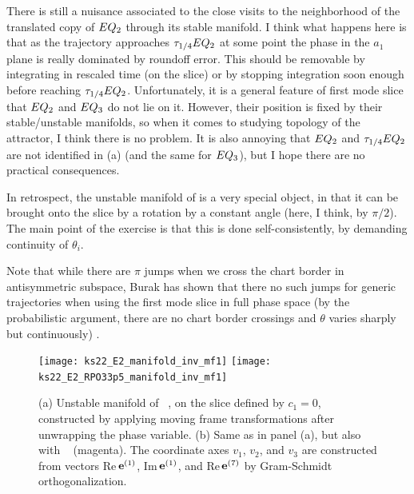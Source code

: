 \begin{description}
There is still a nuisance associated to the close visits to the neighborhood of
the translated copy of $\EQV{2}$ through its stable manifold. I think what happens
here is that as the trajectory approaches $\tau_{1/4}\EQV{2}$ at some point the phase in the
$a_1$ plane is really dominated by roundoff error. This should be removable by
integrating in rescaled time (on the slice) or by stopping integration soon enough
before reaching $\tau_{1/4}\EQV{2}$. Unfortunately, it is a general feature of first
mode slice that $\EQV{2}$ and $\EQV{3}$ do not lie on it. However, their
position is fixed by their stable/unstable manifolds, so when it comes to studying
topology of the attractor, I think there is no problem. It is also annoying that
$\EQV{2}$ and $\tau_{1/4}\EQV{2}$ are not identified in (a)
(and the same for $\EQV{3}$), but I hope there are no practical consequences.

In retrospect, the unstable manifold of  is a very special object, in that it
can be brought onto the slice by a rotation by a constant angle (here, I think,
by $\pi/2$). The main point of the exercise is that this is done self-consistently,
by demanding continuity of $\theta_i$.

Note that while there are $\pi$ jumps when we cross the chart border in antisymmetric
subspace, Burak has shown that there no such jumps for
generic trajectories when using the first mode slice in full phase space (by
the probabilistic argument, there are no chart border crossings and $\theta$
varies sharply but continuously)
.

\begin{figure}[ht]
\begin{center}
\texttt{[image: ks22\_E2\_manifold\_inv\_mf1]}
\texttt{[image: ks22\_E2\_RPO33p5\_manifold\_inv\_mf1]}
\end{center}
\caption{
(a) Unstable manifold of \eqv\ , on the slice defined by $c_1=0$,
constructed by applying moving frame transformations after unwrapping
the phase variable. (b) Same as in panel (a), but also with \rpo\  (magenta).
The coordinate axes $v_1$, $v_2$, and $v_3$ are constructed from vectors Re\,$\jEigvec[1]$,
Im\,$\jEigvec[1]$, and {Re\,}$\jEigvec[7]$ by Gram-Schmidt
orthogonalization.
       }
\label{f:KS22E2man1_unwrapped}
\end{figure}


\end{description}
